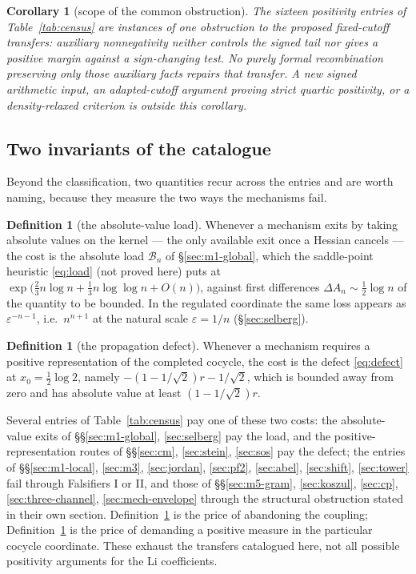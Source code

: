 \documentclass[11pt]{amsart}
\newtheorem{corollary}[theorem]{Corollary}
\theoremstyle{definition}
\newtheorem{definition}[theorem]{Definition}
\theoremstyle{remark}
\theoremstyle{definition}
\newcommand{\eps}{\varepsilon}
\begin{document}
\begin{corollary}[scope of the common obstruction]\label{cor:one-failure}
The sixteen positivity entries of Table~\ref{tab:census} are instances of one obstruction to the proposed
\emph{fixed-cutoff transfers}: auxiliary nonnegativity neither controls the signed tail nor gives
a positive margin against a sign-changing test. No purely formal recombination preserving only
those auxiliary facts repairs that transfer. A new signed arithmetic input, an adapted-cutoff
argument proving strict quartic positivity, or a density-relaxed criterion is outside this
corollary.
\end{corollary}

\subsection{Two invariants of the catalogue}

Beyond the classification, two quantities recur across the entries and are worth naming, because
they measure the two ways the mechanisms fail.

\begin{definition}[the absolute-value load]\label{def:load}
Whenever a mechanism exits by taking absolute values on the kernel --- the only available exit
once a Hessian cancels --- the cost is the absolute load $\mathcal B_n$ of \S\ref{sec:m1-global}, which
the saddle-point heuristic \eqref{eq:load} (not proved here) puts at
$\exp\bigl(\tfrac23n\log n+\tfrac13n\log\log n+O(n)\bigr)$, against
first differences $\Delta A_n\sim\tfrac12\log n$ of the quantity to be bounded. In the regulated coordinate the same loss appears as
$\eps^{-n-1}$, i.e.\ $n^{n+1}$ at the natural scale $\eps=1/n$ (\S\ref{sec:selberg}).
\end{definition}

\begin{definition}[the propagation defect]\label{def:defect}
Whenever a mechanism requires a positive representation of the completed cocycle, the cost is the
defect \eqref{eq:defect} at $x_0=\tfrac12\log2$, namely $-(1-1/\sqrt2)r-1/\sqrt2$, which is
bounded away from zero and has absolute value at least $(1-1/\sqrt2)r$.
\end{definition}

Several entries of Table~\ref{tab:census} pay one of these two costs: the absolute-value exits of
\S\S\ref{sec:m1-global}, \ref{sec:selberg} pay the load, and the positive-representation routes of
\S\S\ref{sec:cm}, \ref{sec:stein}, \ref{sec:sos} pay the defect; the entries of
\S\S\ref{sec:m1-local}, \ref{sec:m3}, \ref{sec:jordan}, \ref{sec:pf2}, \ref{sec:abel},
\ref{sec:shift}, \ref{sec:tower} fail through Falsifiers I or II, and those of
\S\S\ref{sec:m5-gram}, \ref{sec:koszul}, \ref{sec:cp}, \ref{sec:three-channel},
\ref{sec:mech-envelope} through the structural obstruction stated in their own section. Definition~\ref{def:load} is the price
of abandoning the coupling; Definition~\ref{def:defect} is the price of demanding a positive
measure in the particular cocycle coordinate. These exhaust the transfers catalogued here, not
all possible positivity arguments for the Li coefficients.
\end{document}
